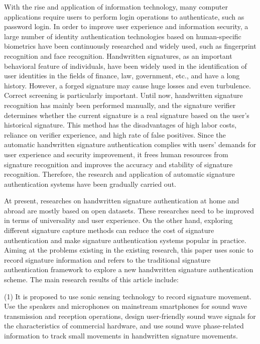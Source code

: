 \begin{englishabstract}

With the rise and application of information technology, many computer applications require users to perform login operations to authenticate, such as password login. In order to improve user experience and information security, a large number of identity authentication technologies based on human-specific biometrics have been continuously researched and widely used, such as fingerprint recognition and face recognition. Handwritten signatures, as an important behavioral feature of individuals, have been widely used in the identification of user identities in the fields of finance, law, government, etc., and have a long history. However, a forged signature may cause huge losses and even turbulence. Correct screening is particularly important. Until now, handwritten signature recognition has mainly been performed manually, and the signature verifier determines whether the current signature is a real signature based on the user's historical signature. This method has the disadvantages of high labor costs, reliance on verifier experience, and high rate of false positives. Since the automatic handwritten signature authentication complies with users' demands for user experience and security improvement, it frees human resources from signature recognition and improves the accuracy and stability of signature recognition. Therefore, the research and application of automatic signature authentication systems have been gradually carried out.

At present, researches on handwritten signature authentication at home and abroad are mostly based on open datasets. These researches need to be improved in terms of universality and user experience. On the other hand, exploring different signature capture methods can reduce the cost of signature authentication and make signature authentication systems popular in practice. Aiming at the problems existing in the existing research, this paper uses sonic to record signature information and refers to the traditional signature authentication framework to explore a new handwritten signature authentication scheme. The main research results of this article include:

(1) It is proposed to use sonic sensing technology to record signature movement. Use the speakers and microphones on mainstream smartphones for sound wave transmission and reception operations, design user-friendly sound wave signals for the characteristics of commercial hardware, and use sound wave phase-related information to track small movements in handwritten signature movements.


\end{englishabstract}
